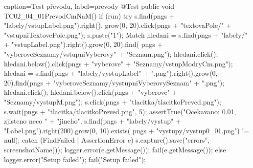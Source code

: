 \begin{lstjava}{caption={Test převodu}, label={prevody}}
@Test
public void TC02_04_01PrevodCmNaM() {
  if (run) {
    try {
      s.find(pngs + "labely/vstupLabel.png").right().
        grow(0, 20).click(pngs + "textovaPole/" +
        "vstupniTextovePole.png");
      s.paste("1");
      Match hledani = s.find(pngs + "labely/" +
        "vstupLabel.png").right().grow(0, 20).find(
        pngs + "vyberoveSeznamy/vstupniVyberovy" +
        "Seznam.png");
      hledani.click();
      hledani.below().click(pngs + "vyberove" +
        "Seznamy/vstupModryCm.png");
      hledani = s.find(pngs + "labely/vystupLabel" +
        ".png").right().grow(0, 20).find(pngs +
        "vyberoveSeznamy/vystupniVyberovySeznam" +
        ".png");
      hledani.click();
      hledani.below().click(pngs + "vyberove" +
        "Seznamy/vystupM.png");
      s.click(pngs + "tlacitka/tlacitkoPreved.png");
      s.wait(pngs + "tlacitka/tlacitkoPreved.png",
        5);
      assertTrue("Ocekavano: 0.01, zjisteno neco " +
        "jineho", s.find(pngs + "labely/vystup" +
        "Label.png").right(200).grow(0, 10).exists(
        pngs + "vystupy/vystup0_01.png") != null);
    } catch (FindFailed | AssertionError e) {
      s.capture().save("errors", screenshotName());
      logger.error(e.getMessage());
      fail(e.getMessage());
    }
  } else {
    logger.error("Setup failed");
    fail("Setup failed");
  }
}
\end{lstjava}
